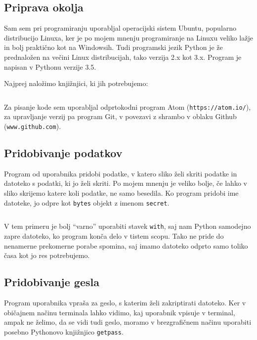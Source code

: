 \subsection{Priprava okolja}
    Sam sem pri programiranju uporabljal operacijski sistem Ubuntu, popularno distribucijo Linuxa, ker je po mojem mnenju programiranje na Linuxu veliko lažje in bolj praktično kot na Windowsih. Tudi programski jezik Python je že prednaložen na večini Linux distribucijah, tako verzija 2.x kot 3.x. Program je napisan v Pythonu verzije 3.5.

    Najprej naložimo knjižnjici, ki jih potrebujemo:

    \inputminted[firstline=1, lastline=2, frame=lines]{bash}{latex/bashscripts.sh}

    Za pisanje kode sem uporabljal odprtokodni program Atom (\texttt{https://atom.io/}), za upravljanje verzij pa program Git, v povezavi z shrambo v oblaku Github (\texttt{www.github.com}). 


\subsection{Pridobivanje podatkov}

    Program od uporabnika pridobi podatke, v katero sliko želi skriti podatke in datoteko s podatki, ki jo želi skriti. Po mojem mnenju je veliko bolje, če lahko v sliko skrijemo katere koli podatke, ne samo besedila. Ko program pridobi ime datoteke, jo odpre kot \texttt{bytes} objekt z imenom \texttt{secret}. 

    \inputminted[firstline=1, lastline=2, frame=lines]{python}{latex/code_parts.py}

    V tem primeru je bolj ``varno'' uporabiti stavek \texttt{with}, saj nam Python samodejno zapre datoteko, ko program konča delo v tistem scopu. Tako ne pride do nenamerne prekomerne porabe spomina, saj imamo datoteko odprto samo toliko časa kot jo res potrebujemo.


\subsection{Pridobivanje gesla}

    Program uporabnika vpraša za geslo, s katerim želi zakriptirati datoteko. Ker v običajnem načinu terminala lahko vidimo, kaj uporabnik vpisuje v terminal, ampak ne želimo, da se vidi tudi geslo, moramo v brezgrafičnem načinu uporabiti posebno Pythonovo knjižnjico \texttt{getpass}.  

